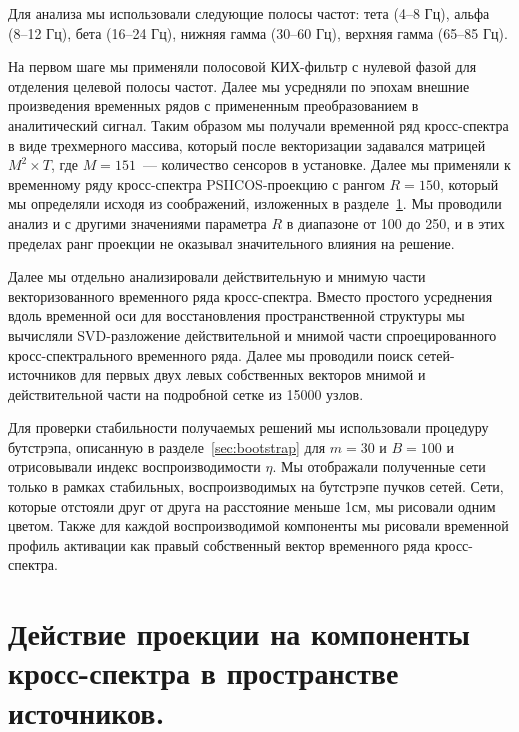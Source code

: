 Для анализа мы использовали следующие полосы частот: тета (4--8 Гц), альфа
(8--12 Гц), бета (16--24 Гц), нижняя гамма (30--60 Гц), верхняя гамма (65--85
Гц).

На первом шаге мы применяли полосовой КИХ-фильтр с нулевой фазой для отделения
целевой полосы частот. Далее мы усредняли по эпохам внешние произведения
временных рядов с примененным преобразованием в аналитический сигнал. Таким
образом мы получали временной ряд кросс-спектра в виде трехмерного массива,
который после векторизации задавался матрицей $M^2 \times T$, где $M=151$~---
количество сенсоров в установке. Далее мы применяли к временному ряду
кросс-спектра PSIICOS-проекцию с рангом $R=150$, который мы определяли исходя
из соображений, изложенных в разделе~\ref{sec:subspaces_attenuation}. Мы
проводили анализ и с другими значениями параметра $R$ в диапазоне от 100 до
250, и в этих пределах ранг проекции не оказывал значительного влияния на
решение.

Далее мы отдельно анализировали действительную и мнимую части векторизованного
временного ряда кросс-спектра. Вместо простого усреднения вдоль временной оси
для восстановления пространственной структуры мы вычисляли SVD-разложение
действительной и мнимой части спроецированного кросс-спектрального временного
ряда. Далее мы проводили поиск сетей-источников для первых двух левых
собственных векторов мнимой и действительной части на подробной сетке из 15000
узлов.

Для проверки стабильности получаемых решений мы использовали процедуру
бутстрэпа, описанную в разделе~\ref{sec:bootstrap} для $m=30$ и $B=100$ и
отрисовывали индекс воспроизводимости $\eta$.  Мы отображали полученные сети
только в рамках стабильных, воспроизводимых на бутстрэпе пучков сетей. Сети,
которые отстояли друг от друга на расстояние меньше 1см, мы рисовали одним
цветом.  Также для каждой воспроизводимой компоненты мы рисовали временной
профиль активации как правый собственный вектор временного ряда кросс-спектра.


\section{Действие проекции на компоненты кросс-спектра в пространстве источников.}\label{sec:subspaces_attenuation}

